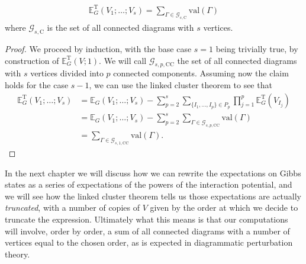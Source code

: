 \begin{theorem}
	\begin{align*}
		\mathbb{E}_G^{\mathrm{T}}(V_1;\ldots;V_s) = \sum_{\Gamma\in\mathcal{G}_{s,\mathrm{C}}}
		\mathrm{val}(\Gamma)
	\end{align*}
	where $\mathcal{G}_{s,\mathrm{C}}$ is the set of all connected diagrams with $s$ vertices.
\end{theorem}
\begin{proof}
	We proceed by induction, with the base case $s=1$ being trivially true, by construction of
	$\mathbb{E}_G^{\mathrm{T}}(V;1)$. We will call $\mathcal{G}_{s,p,\mathrm{CC}}$ the set of
	all connected diagrams with $s$ vertices divided into $p$ connected components. Assuming
	now the claim holds for the case $s-1$, we can use the linked cluster theorem to see that
	\begin{align*}
		\mathbb{E}_G^{\mathrm{T}}(V_1;\ldots;V_s)
		&= \mathbb{E}_G(V_1;\ldots;V_s) - \sum_{p=2}^s \sum_{\{I_1,\ldots,I_p\}\in P_p}
		\prod_{j=1}^p \mathbb{E}_G^{\mathrm{T}}(V_{I_j})\\
		&= \mathbb{E}_G(V_1;\ldots;V_s) - \sum_{p=2}^s \sum_{\Gamma\in\mathcal{G}_{s,p,\mathrm{CC}}}\mathrm{val}(\Gamma)\\
		&= \sum_{\Gamma\in\mathcal{G}_{s,1,\mathrm{CC}}}\mathrm{val}(\Gamma).
	\end{align*}
\end{proof}

In the next chapter we will discuss how we can rewrite the expectations on Gibbs states as a
series of expectations of the powers of the interaction potential, and we will see how the
linked cluster theorem tells us those expectations are actually \textit{truncated}, with a
number of copies of $V$ given by the order at which we decide to truncate the expression.
Ultimately what this means is that our computations will involve, order by order, a sum of all
connected diagrams with a number of vertices equal to the chosen order, as is expected in
diagrammatic perturbation theory.
